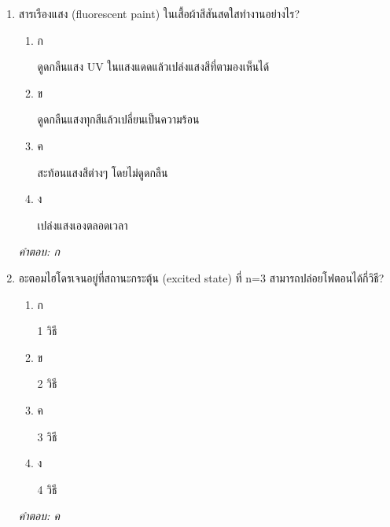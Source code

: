 \documentclass[12pt]{article}
\begin{document}
\begin{enumerate}[label=\arabic*., itemsep=0.5\baselineskip, topsep=0.5\baselineskip, leftmargin=*]
\item สารเรืองแสง (fluorescent paint) ในเสื้อผ้าสีสันสดใสทำงานอย่างไร?
\begin{enumerate}[label=\alph*)., itemsep=0.3\baselineskip, topsep=0.3\baselineskip]
\item ก\ 
\begin{minipage}[t]{0.9\linewidth}
\raggedright ดูดกลืนแสง UV ในแสงแดดแล้วเปล่งแสงสีที่ตามองเห็นได้
\end{minipage}
\item ข\ 
\begin{minipage}[t]{0.9\linewidth}
\raggedright ดูดกลืนแสงทุกสีแล้วเปลี่ยนเป็นความร้อน
\end{minipage}
\item ค\ 
\begin{minipage}[t]{0.9\linewidth}
\raggedright สะท้อนแสงสีต่างๆ โดยไม่ดูดกลืน
\end{minipage}
\item ง\ 
\begin{minipage}[t]{0.9\linewidth}
\raggedright เปล่งแสงเองตลอดเวลา
\end{minipage}
\end{enumerate}
\vspace{-0.3\baselineskip}
\begin{small}
\textit{คำตอบ: ก}
\end{small}

\item อะตอมไฮโดรเจนอยู่ที่สถานะกระตุ้น (excited state) ที่ n=3 สามารถปล่อยโฟตอนได้กี่วิธี?
\begin{enumerate}[label=\alph*)., itemsep=0.3\baselineskip, topsep=0.3\baselineskip]
\item ก\ 
\begin{minipage}[t]{0.9\linewidth}
\raggedright 1 วิธี
\end{minipage}
\item ข\ 
\begin{minipage}[t]{0.9\linewidth}
\raggedright 2 วิธี
\end{minipage}
\item ค\ 
\begin{minipage}[t]{0.9\linewidth}
\raggedright 3 วิธี
\end{minipage}
\item ง\ 
\begin{minipage}[t]{0.9\linewidth}
\raggedright 4 วิธี
\end{minipage}
\end{enumerate}
\vspace{-0.3\baselineskip}
\begin{small}
\textit{คำตอบ: ค}
\end{small}


\end{enumerate}
\end{document}
